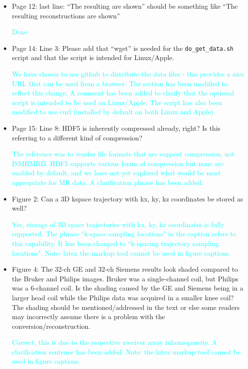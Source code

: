 \documentclass[12pt, draft]{article}
\makeatletter
\def\namedlabel#1#2{\begingroup#2\def\@currentlabel{#2}\phantomsection\label{#1}\endgroup}
\newcommand{\question}[1]{\item[\namedlabel{q#1}{#1}]}
\newcommand{\response}[1]{\textcolor{cyan}{#1}}
\makeatother
\begin{document}
{\begin{itemize}
\question{R2.25} Page 12: last line: ``The resulting are shown'' should be something like ``The resulting reconstructions are shown''

\response{Done}

\question{R2.26} Page 14: Line 3: Please add that ``wget'' is needed for the \texttt{do\_get\_data.sh} script and that the script is intended for Linux/Apple.

\response{We have chosen to use github to distribute the data files - this provides a nice URL that can be used from a browser.  The section has been modified to reflect this change.  A comment has been added to clarify that the optional script is intended to be used on Linux/Apple.  The script has also been modified to use curl (installed by default on both Linux and Apple).}

\question{R2.27} Page 15: Line 8: HDF5 is inherently compressed already, right? Is this referring to a different kind of compression?

\response{The reference was to vendor file formats that are support compression, not ISMRMRD. HDF5 supports various forms of compression but none are enabled by default, and we have not yet explored what would be most appropriate for MR data.  A clarification phrase has been added.}

\question{R2.28} Figure 2: Can a 3D kspace trajectory with kx, ky, kz coordinates be stored as well?

\response{Yes, storage of 3D space trajectories with kx, ky, kz coordinates is fully supported.  The phrase ``k-space sampling locations" in the caption refers to this capability.  It has been changed to ``k-spacing trajectory sampling locations".  Note: latex the markup tool cannot be used in figure captions.}

\question{R2.29} Figure 4: The 32-ch GE and 32-ch Siemens results look shaded compared to the Bruker and Philips images. Bruker was a single-channel coil, but Philips was a 6-channel coil. Is the shading caused by the GE and Siemens being in a larger head coil while the Philips data was acquired in a smaller knee coil? The shading should be mentioned/addressed in the text or else some readers may incorrectly assume there is a problem with the conversion/reconstruction.

\response{Correct, this is due to the respective receiver array inhomogeneity. A clarification sentence has been added. Note: the latex markup tool cannot be used in figure captions.}

\end{itemize}

\listofchanges

}%
\end{document}
